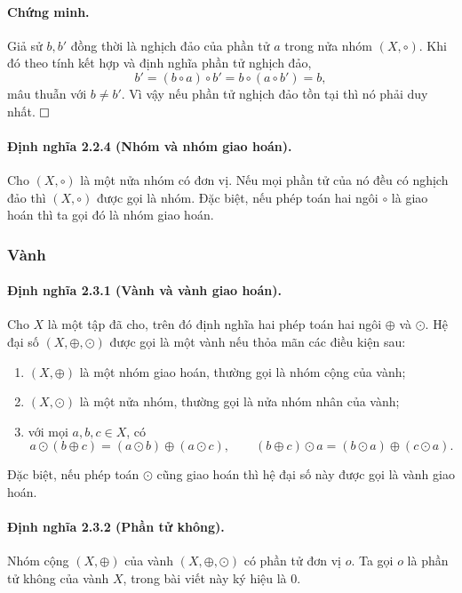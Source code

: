 \documentclass[11pt]{article}
\newcommand{\proofbox}{\ensuremath{\vcenter{\hrule height 0.45pt
  \hbox{\vrule width 0.45pt height 6pt\kern 6pt\vrule width 0.45pt}
  \hrule height 0.45pt}}}
\begin{document}
\paragraph{Chứng minh.}
Giả sử \(b,b'\) đồng thời là nghịch đảo của phần tử \(a\) trong nửa nhóm
\((X,\circ)\). Khi đó theo tính kết hợp và định nghĩa phần tử nghịch đảo,
\[
  b'=(b\circ a)\circ b'=b\circ(a\circ b')=b,
\]
mâu thuẫn với \(b\ne b'\). Vì vậy nếu phần tử nghịch đảo tồn tại thì nó phải duy
nhất. \(\proofbox\)

\paragraph{Định nghĩa 2.2.4 (Nhóm và nhóm giao hoán).}
Cho \((X,\circ)\) là một nửa nhóm có đơn vị. Nếu mọi phần tử của nó đều có
nghịch đảo thì \((X,\circ)\) được gọi là nhóm. Đặc biệt, nếu phép toán hai ngôi
\(\circ\) là giao hoán thì ta gọi đó là nhóm giao hoán.

\subsubsection{Vành}

\paragraph{Định nghĩa 2.3.1 (Vành và vành giao hoán).}
Cho \(X\) là một tập đã cho, trên đó định nghĩa hai phép toán hai ngôi \(\oplus\)
và \(\odot\). Hệ đại số \((X,\oplus,\odot)\) được gọi là một vành nếu thỏa mãn
các điều kiện sau:
\begin{enumerate}
  \item \((X,\oplus)\) là một nhóm giao hoán, thường gọi là nhóm cộng của vành;
  \item \((X,\odot)\) là một nửa nhóm, thường gọi là nửa nhóm nhân của vành;
  \item với mọi \(a,b,c\in X\), có
  \[
    a\odot(b\oplus c)=(a\odot b)\oplus(a\odot c),\qquad
    (b\oplus c)\odot a=(b\odot a)\oplus(c\odot a).
  \]
\end{enumerate}
Đặc biệt, nếu phép toán \(\odot\) cũng giao hoán thì hệ đại số này được gọi là
vành giao hoán.

\paragraph{Định nghĩa 2.3.2 (Phần tử không).}
Nhóm cộng \((X,\oplus)\) của vành \((X,\oplus,\odot)\) có phần tử đơn vị \(o\).
Ta gọi \(o\) là phần tử không của vành \(X\), trong bài viết này ký hiệu là
\(0\).
\end{document}
